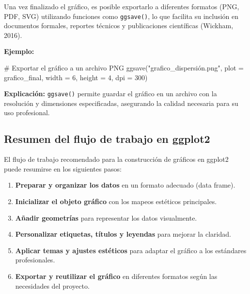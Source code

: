 \documentclass[
  spanish,
  a4paper,
  DIV=11,
  numbers=noendperiod,
  onepage,
  openany]{scrreprt}
\newenvironment{Shaded}{\begin{snugshade}}{\end{snugshade}}
\newcommand{\AttributeTok}[1]{\textcolor[rgb]{0.40,0.45,0.13}{#1}}
\newcommand{\CommentTok}[1]{\textcolor[rgb]{0.37,0.37,0.37}{#1}}
\newcommand{\DecValTok}[1]{\textcolor[rgb]{0.68,0.00,0.00}{#1}}
\newcommand{\FunctionTok}[1]{\textcolor[rgb]{0.28,0.35,0.67}{#1}}
\newcommand{\NormalTok}[1]{\textcolor[rgb]{0.00,0.23,0.31}{#1}}
\newcommand{\StringTok}[1]{\textcolor[rgb]{0.13,0.47,0.30}{#1}}
\begin{document}
Una vez finalizado el gráfico, es posible exportarlo a diferentes
formatos (PNG, PDF, SVG) utilizando funciones como \texttt{ggsave()}, lo
que facilita su inclusión en documentos formales, reportes técnicos y
publicaciones científicas (Wickham, 2016).

\textbf{Ejemplo:}

\begin{Shaded}
\begin{Highlighting}[]
\CommentTok{\# Exportar el gráfico a un archivo PNG}
\FunctionTok{ggsave}\NormalTok{(}\StringTok{"grafico\_dispersión.png"}\NormalTok{, }
       \AttributeTok{plot =}\NormalTok{ grafico\_final, }
       \AttributeTok{width =} \DecValTok{6}\NormalTok{, }\AttributeTok{height =} \DecValTok{4}\NormalTok{, }\AttributeTok{dpi =} \DecValTok{300}\NormalTok{)}
\end{Highlighting}
\end{Shaded}

\textbf{Explicación:} \texttt{ggsave()} permite guardar el gráfico en un
archivo con la resolución y dimensiones especificadas, asegurando la
calidad necesaria para su uso profesional.

\subsection{Resumen del flujo de trabajo en
ggplot2}\label{resumen-del-flujo-de-trabajo-en-ggplot2}

El flujo de trabajo recomendado para la construcción de gráficos en
ggplot2 puede resumirse en los siguientes pasos:

\begin{enumerate}
\def\labelenumi{\arabic{enumi}.}
\item
  \textbf{Preparar y organizar los datos} en un formato adecuado (data
  frame).
\item
  \textbf{Inicializar el objeto gráfico} con los mapeos estéticos
  principales.
\item
  \textbf{Añadir geometrías} para representar los datos visualmente.
\item
  \textbf{Personalizar etiquetas, títulos y leyendas} para mejorar la
  claridad.
\item
  \textbf{Aplicar temas y ajustes estéticos} para adaptar el gráfico a
  los estándares profesionales.
\item
  \textbf{Exportar y reutilizar el gráfico} en diferentes formatos según
  las necesidades del proyecto.
\end{enumerate}
\end{document}
